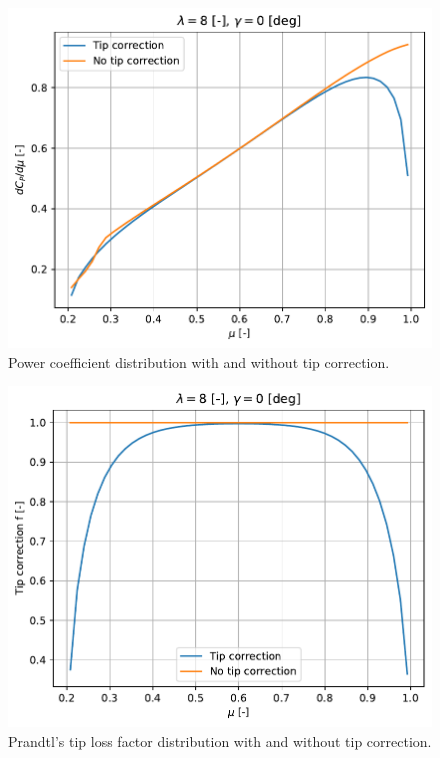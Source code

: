 \begin{figure}[htbp]
	\centering
	\includegraphics[height=0.45\textheight]{./img/tip-correction/dcp_dmu.pdf}
	\caption{Power coefficient distribution with and without tip correction.}
	\label{img:tc-dcp-dmu}
\end{figure}

\begin{figure}[htbp]
	\centering
	\includegraphics[height=0.45\textheight]{./img/tip-correction/f.pdf}
	\caption{Prandtl's tip loss factor distribution with and without tip correction.}
	\label{img:tc-f}
\end{figure}


